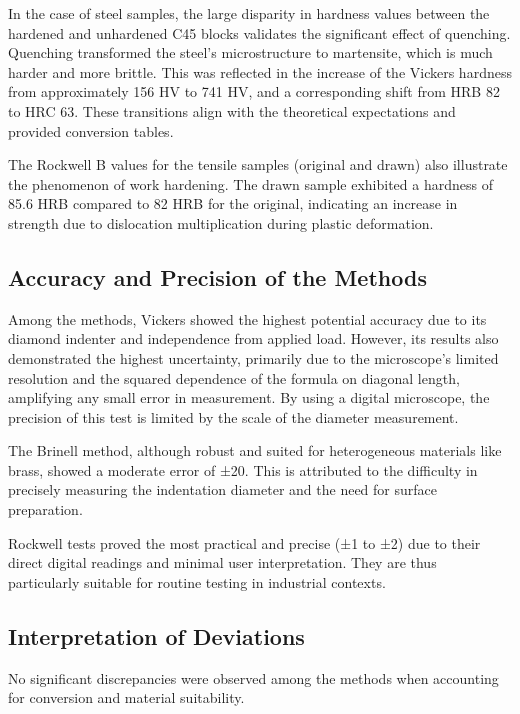 \documentclass[a4paper]{article}
\begin{document}
  In the case of steel samples, the large disparity in hardness values between the hardened and unhardened C45 blocks validates the significant effect of quenching. Quenching transformed the steel’s microstructure to martensite, which is much harder and more brittle\cite{DewolfMaterials}. This was reflected in the increase of the Vickers hardness from approximately 156 HV to 741 HV, and a corresponding shift from HRB 82 to HRC 63. These transitions align with the theoretical expectations and provided conversion tables\cite{ASTME140}.
  
  The Rockwell B values for the tensile samples (original and drawn) also illustrate the phenomenon of work hardening. The drawn sample exhibited a hardness of 85.6 HRB compared to 82 HRB for the original, indicating an increase in strength due to dislocation multiplication during plastic deformation.
  
  \subsection{Accuracy and Precision of the Methods}
  
  Among the methods, Vickers showed the highest potential accuracy due to its
  diamond indenter and independence from applied load. However, its results also
  demonstrated the highest uncertainty, primarily due to the microscope's
  limited resolution and the squared dependence of the formula on diagonal
  length, amplifying any small error in measurement. By using a digital
  microscope, the precision of this test is limited by the scale of the diameter
  measurement.
  
  The Brinell method, although robust and suited for heterogeneous materials like brass, showed a moderate error of ±20. This is attributed to the difficulty in precisely measuring the indentation diameter and the need for surface preparation.
  
  Rockwell tests proved the most practical and precise (±1 to ±2) due to their direct digital readings and minimal user interpretation\cite{astme18}. They are thus particularly suitable for routine testing in industrial contexts.
  
  \subsection{Interpretation of Deviations}
  
  No significant discrepancies were observed among the methods when accounting
  for conversion and material suitability. 
  \newpage
  
\end{document}
